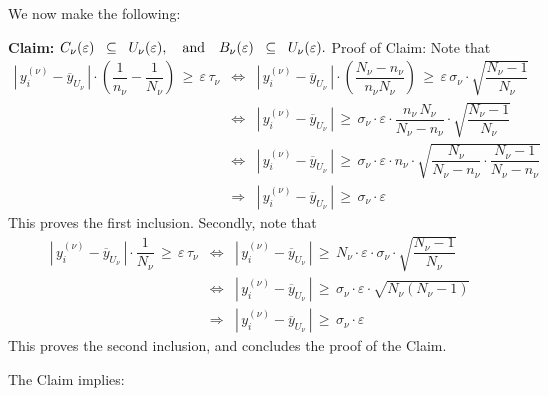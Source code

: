 We now make the following:
\begin{center}
\begin{minipage}{6.0in}
\noindent
\textbf{Claim:}\quad
$
C_{\nu}(\varepsilon) \;\;\subseteq\;\; U_{\nu}(\varepsilon),
\quad\textnormal{and}\quad
B_{\nu}(\varepsilon) \;\;\subseteq\;\; U_{\nu}(\varepsilon).
$
\vskip 0.2cm
\noindent
Proof of Claim: \; Note that
\begin{eqnarray*}
\left\vert\,y^{(\nu)}_{i} - \overline{y}_{U_{\nu}}\,\right\vert
\cdot
\left(\dfrac{1}{n_{\nu}} - \dfrac{1}{N_{\nu}}\right)
\,\geq\,\varepsilon\,\tau_{\nu}
&\Longleftrightarrow&
\left\vert\,y^{(\nu)}_{i} - \overline{y}_{U_{\nu}}\,\right\vert
\cdot
\left(\dfrac{N_{\nu} - n_{\nu}}{n_{\nu}N_{\nu}}\right)
\,\geq\,\varepsilon\,\sigma_{\nu}
\cdot
\sqrt{\dfrac{N_{\nu}-1}{N_{\nu}}}
\\
&\Longleftrightarrow&
\left\vert\,y^{(\nu)}_{i} - \overline{y}_{U_{\nu}}\,\right\vert
\,\geq\,
\sigma_{\nu}\cdot\varepsilon
\cdot
\dfrac{n_{\nu}\,N_{\nu}}{N_{\nu} - n_{\nu}}
\cdot
\sqrt{\dfrac{N_{\nu}-1}{N_{\nu}}}
\\
&\Longleftrightarrow&
\left\vert\,y^{(\nu)}_{i} - \overline{y}_{U_{\nu}}\,\right\vert
\,\geq\,
\sigma_{\nu}\cdot\varepsilon
\cdot n_{\nu} \cdot
\sqrt{\dfrac{N_{\nu}}{N_{\nu} - n_{\nu}}\cdot\dfrac{N_{\nu}-1}{N_{\nu} - n_{\nu}}}
\\
&\Longrightarrow&
\left\vert\,y^{(\nu)}_{i} - \overline{y}_{U_{\nu}}\,\right\vert
\,\geq\,
\sigma_{\nu}\cdot\varepsilon
\end{eqnarray*}
This proves the first inclusion.
Secondly, note that
\begin{eqnarray*}
\left\vert\,y^{(\nu)}_{i} - \overline{y}_{U_{\nu}}\,\right\vert \cdot \dfrac{1}{N_{\nu}}
\,\geq\,\varepsilon\,\tau_{\nu}
&\Longleftrightarrow&
\left\vert\,y^{(\nu)}_{i} - \overline{y}_{U_{\nu}}\,\right\vert
\,\geq\,
N_{\nu} \cdot \varepsilon \cdot \sigma_{\nu} \cdot
\sqrt{\dfrac{N_{\nu}-1}{N_{\nu}}}
\\
&\Longleftrightarrow&
\left\vert\,y^{(\nu)}_{i} - \overline{y}_{U_{\nu}}\,\right\vert
\,\geq\,
\sigma_{\nu} \cdot \varepsilon \cdot \sqrt{N_{\nu}(N_{\nu}-1)}
\\
&\Longrightarrow&
\left\vert\,y^{(\nu)}_{i} - \overline{y}_{U_{\nu}}\,\right\vert
\,\geq\,
\sigma_{\nu} \cdot \varepsilon
\end{eqnarray*}
This proves the second inclusion, and concludes the proof of the Claim.
\end{minipage}
\end{center}
The Claim implies:
